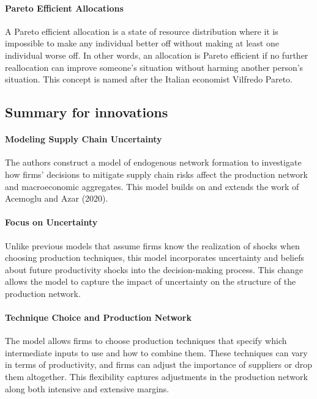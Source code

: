 \documentclass[11pt]{article}
\theoremstyle{definition}
\begin{document}
	\paragraph{Pareto Efficient Allocations} A Pareto efficient allocation is a state of resource distribution where it is impossible to make any individual better off without making at least one individual worse off. In other words, an allocation is Pareto efficient if no further reallocation can improve someone's situation without harming another person's situation. This concept is named after the Italian economist Vilfredo Pareto.
	
	
	
	
	
	
	
	
	
	\subsection{Summary for innovations} 
	\paragraph{Modeling Supply Chain Uncertainty} The authors construct a model of endogenous network formation to investigate how firms' decisions to mitigate supply chain risks affect the production network and macroeconomic aggregates. This model builds on and extends the work of Acemoglu and Azar (2020).
	
	\paragraph{Focus on Uncertainty}Unlike previous models that assume firms know the realization of shocks when choosing production techniques, this model incorporates uncertainty and beliefs about future productivity shocks into the decision-making process. This change allows the model to capture the impact of uncertainty on the structure of the production network.
	
	\paragraph{Technique Choice and Production Network} The model allows firms to choose production techniques that specify which intermediate inputs to use and how to combine them. These techniques can vary in terms of productivity, and firms can adjust the importance of suppliers or drop them altogether. This flexibility captures adjustments in the production network along both intensive and extensive margins.
	
\end{document}

